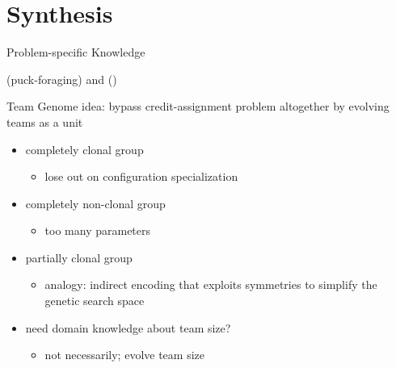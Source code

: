 \section{Synthesis}

\begin{frame}{Problem-specific Knowledge}

\cite{waibel2009genetic} (puck-foraging) and \cite{knudson2010coevolution} ()

\end{frame}

\begin{frame}{Team Genome}
idea: bypass credit-assignment problem altogether by evolving teams as a unit

\begin{itemize}
\item completely clonal group
\begin{itemize}
\item lose out on configuration specialization
\end{itemize}
\item completely non-clonal group
\begin{itemize}
\item too many parameters
\end{itemize}
\item partially clonal group \cite{bongard2000legion}
\begin{itemize}
\item analogy: indirect encoding that exploits symmetries to simplify the genetic search space \cite{bongard2000legion}
\end{itemize}
\item need domain knowledge about team size?
\begin{itemize}
\item not necessarily; evolve team size \cite{bongard2000legion}
\end{itemize}

\end{itemize}


\end{frame}


